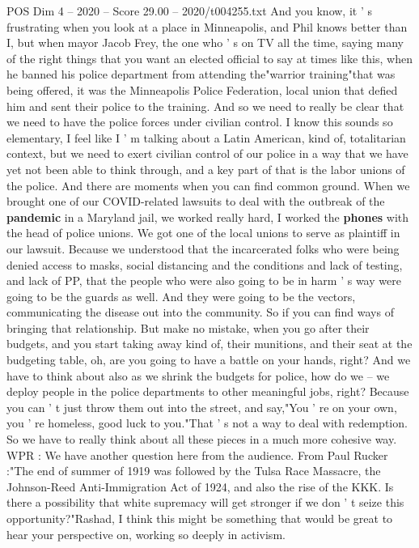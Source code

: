 \begin{textsample}{POS Dim 4 – 2020 – Score 29.00 – 2020/t004255.txt}
And you know, it ' s frustrating when you look at a place in Minneapolis, and Phil knows better than I, but when mayor Jacob Frey, the one who ' s on TV all the time, saying many of the right things that you want an elected official to say at times like this, when he banned his police department from attending the"warrior training"that was being offered, it was the Minneapolis Police Federation, local union that defied him and sent their police to the training.
And so we need to really be clear that we need to have the police forces under civilian control.
I know this sounds so elementary, I feel like I ' m talking about a Latin American, kind of, totalitarian context, but we need to exert civilian control of our police in a way that we have yet not been able to think through, and a key part of that is the labor unions of the police.
And there are moments when you can find common ground.
When we brought one of our COVID-related lawsuits to deal with the outbreak of the \textbf{pandemic} in a Maryland jail, we worked really hard, I worked the \textbf{phones} with the head of police unions.
We got one of the local unions to serve as plaintiff in our lawsuit.
Because we understood that the incarcerated folks who were being denied access to masks, social distancing and the conditions and lack of testing, and lack of PP, that the people who were also going to be in harm ' s way were going to be the guards as well.
And they were going to be the vectors, communicating the disease out into the community.
So if you can find ways of bringing that relationship.
But make no mistake, when you go after their budgets, and you start taking away kind of, their munitions, and their seat at the budgeting table, oh, are you going to have a battle on your hands, right?
And we have to think about also as we shrink the budgets for police, how do we -- we deploy people in the police departments to other meaningful jobs, right?
Because you can ' t just throw them out into the street, and say,"You ' re on your own, you ' re homeless, good luck to you."That ' s not a way to deal with redemption.
So we have to really think about all these pieces in a much more cohesive way.
WPR : We have another question here from the audience.
From Paul Rucker :"The end of summer of 1919 was followed by the Tulsa Race Massacre, the Johnson-Reed Anti-Immigration Act of 1924, and also the rise of the KKK.
Is there a possibility that white supremacy will get stronger if we don ' t seize this opportunity?"Rashad, I think this might be something that would be great to hear your perspective on, working so deeply in activism.

\end{textsample}
